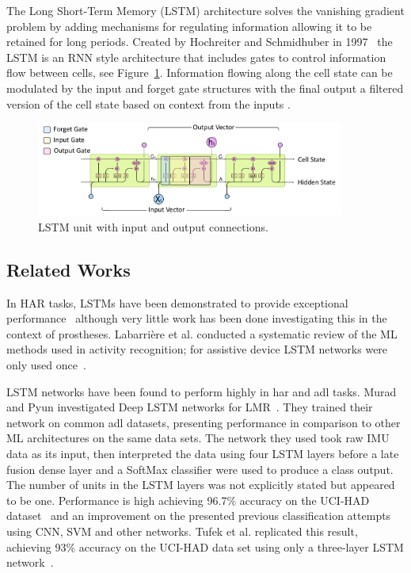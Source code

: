 The Long Short-Term Memory (LSTM) architecture solves the vanishing gradient problem by adding mechanisms for regulating information allowing it to be retained for long periods. Created by Hochreiter and Schmidhuber in 1997~\cite{Hochreiter1997} the LSTM is an RNN style architecture that includes gates to control information flow between cells, see Figure~\ref{fig:lstm_unit}. Information flowing along the cell state can be modulated by the input and forget gate structures with the final output a filtered version of the cell state based on context from the inputs \cite{Olah2015}.

\begin{figure}[!hbt]
    \centering
    \includegraphics[width=0.9\textwidth]{content/4-LSTM_Behaviour/lstm/lstm_internal_operation.pdf}
    \caption{LSTM unit with input and output connections.}
    \label{fig:lstm_unit}
\end{figure}

\subsection{Related Works}
\label{sec:related_work}
In HAR tasks, LSTMs have been demonstrated to provide exceptional performance~\cite{Murad2017} although very little work has been done investigating this in the context of prostheses. Labarri\`ere et al. conducted a systematic review of the ML methods used in activity recognition; for assistive device LSTM networks were only used once~\cite{Labarriere2020}.

LSTM networks have been found to perform highly in \acrshort{har} and \acrfull{adl} tasks. Murad and Pyun investigated Deep LSTM networks for LMR~\cite{Murad2017}. They trained their network on common \acrshort{adl} datasets, presenting performance in comparison to other ML architectures on the same data sets. The network they used took raw IMU data as its input, then interpreted the data using four LSTM layers before a late fusion dense layer and a SoftMax classifier were used to produce a class output. The number of units in the LSTM layers was not explicitly stated but appeared to be one. Performance is high achieving 96.7\% accuracy on the UCI-HAD dataset~\cite{Anguita2013} and an improvement on the presented previous classification attempts using CNN, SVM and other networks. Tufek et al. replicated this result, achieving 93\% accuracy on the UCI-HAD data set using only a three-layer LSTM network~\cite{Tufek2020}.


